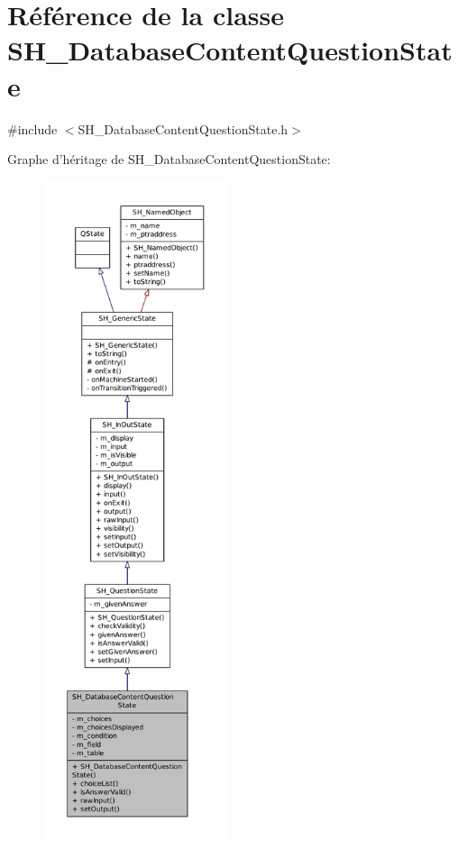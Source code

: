 \hypertarget{classSH__DatabaseContentQuestionState}{\section{Référence de la classe S\-H\-\_\-\-Database\-Content\-Question\-State}
\label{classSH__DatabaseContentQuestionState}
}


{\ttfamily \#include $<$S\-H\-\_\-\-Database\-Content\-Question\-State.\-h$>$}



Graphe d'héritage de S\-H\-\_\-\-Database\-Content\-Question\-State\-:
\nopagebreak
\begin{figure}[H]
\begin{center}
\leavevmode
\includegraphics[height=550pt]{classSH__DatabaseContentQuestionState__inherit__graph}
\end{center}
\end{figure}



